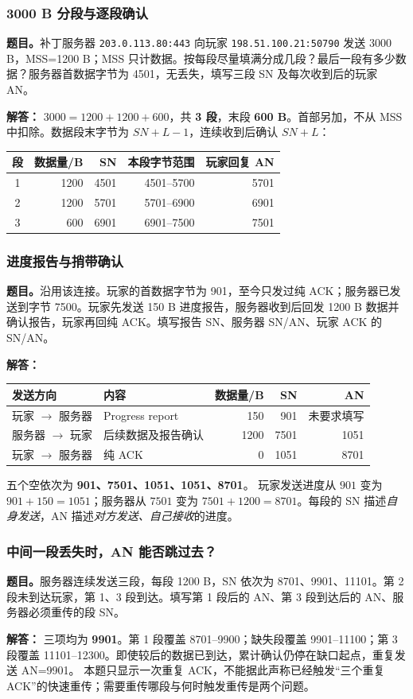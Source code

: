 \documentclass[11pt,a4paper,fontset=fandol]{ctexart}
\renewcommand{\exercisequestion}[2]{%
  \Needspace{5\baselineskip}%
  \subsubsection{#2}\label{exercise:#1}%
}
\renewenvironment{checkedsolution}
  {\par\nopagebreak[4]\textbf{解答：}\ignorespaces}
  {\par}
\begin{document}
\exercisequestion{SC2008-HW04-Q07}{3000 B 分段与逐段确认}
\textbf{题目。}补丁服务器 \texttt{203.0.113.80:443} 向玩家 \texttt{198.51.100.21:50790} 发送 3000 B，MSS=1200 B；MSS 只计数据。按每段尽量填满分成几段？最后一段有多少数据？服务器首数据字节为 4501，无丢失，填写三段 SN 及每次收到后的玩家 AN。
\begin{checkedsolution}
$3000=1200+1200+600$，共 \textbf{3 段}，末段 \textbf{600 B}。首部另加，不从 MSS 中扣除。数据段末字节为 $SN+L-1$，连续收到后确认 $SN+L$：
\begin{center}
\small
\begin{tabular}{@{}crrrr@{}}
\toprule
段 & 数据量/B & SN & 本段字节范围 & 玩家回复 AN \\
\midrule
1 & 1200 & 4501 & 4501--5700 & 5701 \\
2 & 1200 & 5701 & 5701--6900 & 6901 \\
3 & 600 & 6901 & 6901--7500 & 7501 \\
\bottomrule
\end{tabular}
\end{center}
\end{checkedsolution}

\exercisequestion{SC2008-HW04-Q08}{进度报告与捎带确认}
\textbf{题目。}沿用该连接。玩家的首数据字节为 901，至今只发过纯 ACK；服务器已发送到字节 7500。玩家先发送 150 B 进度报告，服务器收到后回发 1200 B 数据并确认报告，玩家再回纯 ACK。填写报告 SN、服务器 SN/AN、玩家 ACK 的 SN/AN。
\begin{checkedsolution}
\begin{center}
\small
\begin{tabular}{@{}llrrr@{}}
\toprule
发送方向 & 内容 & 数据量/B & SN & AN \\
\midrule
玩家 $\to$ 服务器 & Progress report & 150 & 901 & 未要求填写 \\
服务器 $\to$ 玩家 & 后续数据及报告确认 & 1200 & 7501 & 1051 \\
玩家 $\to$ 服务器 & 纯 ACK & 0 & 1051 & 8701 \\
\bottomrule
\end{tabular}
\end{center}
五个空依次为 \textbf{901、7501、1051、1051、8701}。
玩家发送进度从 $901$ 变为 $901+150=1051$；服务器从 $7501$ 变为 $7501+1200=8701$。每段的 SN 描述\emph{自身发送}，AN 描述\emph{对方发送、自己接收}的进度。
\end{checkedsolution}

\exercisequestion{SC2008-HW04-Q09}{中间一段丢失时，AN 能否跳过去？}
\textbf{题目。}服务器连续发送三段，每段 1200 B，SN 依次为 8701、9901、11101。第 2 段未到达玩家，第 1、3 段到达。填写第 1 段后的 AN、第 3 段到达后的 AN、服务器必须重传的段 SN。
\begin{checkedsolution}
三项均为 \textbf{9901}。第 1 段覆盖 8701--9900；缺失段覆盖 9901--11100；第 3 段覆盖 11101--12300。即使较后的数据已到达，累计确认仍停在缺口起点，重复发送 AN=9901。
本题只显示一次重复 ACK，不能据此声称已经触发“三个重复 ACK”的快速重传；需要重传哪段与何时触发重传是两个问题。
\end{checkedsolution}
\end{document}
